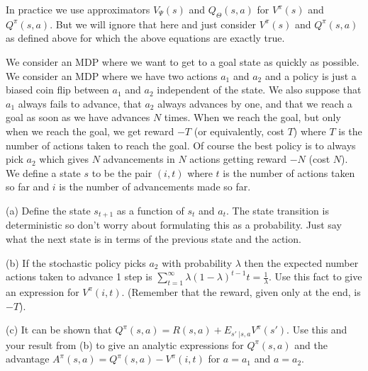 In practice we use approximators $V_\Psi(s)$ and $Q_\Theta(s,a)$
for $V^\pi(s)$ and $Q^\pi(s,a)$. But we will ignore that here and just consider $V^\pi(s)$ and $Q^\pi(s,a)$ as defined above for which the above equations are exactly true.

\medskip
We consider an MDP where we want to get to a goal state as quickly as possible.
We consider an MDP where we have two actions $a_1$ and $a_2$ and a policy is just
a biased coin flip between $a_1$ and $a_2$ independent of the state.  We also suppose that $a_1$ always fails to advance, that $a_2$ always advances by one, and that we reach a goal
as soon as we have advances $N$ times. When we reach the goal, but only when we reach the goal, we get reward $-T$ (or equivalently, cost $T$)
where $T$ is the number of actions taken to reach the goal.  Of course the best policy is to always pick $a_2$ which gives $N$ advancements in $N$ actions getting reward $-N$ (cost $N$).
We define a state $s$ to be the pair $(i,t)$ where $t$ is the number of actions taken so far and $i$ is the number of advancements made so far.

\medskip
(a) Define the state $s_{t+1}$ as a function of $s_t$ and $a_t$.
The state transition is deterministic so don't worry about formulating this as a probability.  Just say what the next state is in terms of the previous state and the action.


\medskip
(b) If the stochastic policy picks $a_2$ with probability $\lambda$ then the expected number actions taken to advance 1 step is $\sum_{t = 1}^\infty \lambda(1-\lambda)^{t-1}t = \frac{1}{\lambda}$.
Use this fact to give an expression for $V^\pi(i,t)$. (Remember that the reward, given only at the end, is $-T$).


\medskip
(c) It can be shown that $Q^\pi(s,a) = R(s,a) + E_{s'\;| s,a} V^\pi(s')$.  Use this and your result from (b) to give an analytic expressions for $Q^\pi(s,a)$ and the advantage $A^\pi(s,a) = Q^\pi(s,a) - V^\pi(i,t)$
for $a = a_1$ and $a= a_2$.

